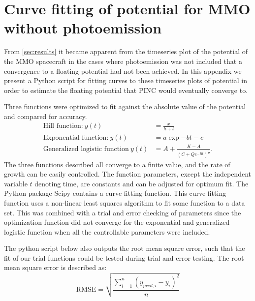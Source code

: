 \chapter{Curve fitting of potential for MMO without photoemission}
\label{sec:appendixC}
\newenvironment{longlisting}{\captionsetup{type=listing}}{}

From \cref{sec:results} it became apparent from the timeseries plot of the potential of the MMO spacecraft in the cases where photoemission was not included that a convergence to a floating potential had not been achieved. In this appendix we present a Python script for fitting curves to these timeseries plots of potential in order to estimate the floating potential that PINC would eventually converge to.

Three functions were optimized to fit against the absolute value of the potential and compared for accuracy.
\begin{subequations}
    \begin{align}
        \text{Hill function:} \: y(t) &= \frac{x}{h + t}\label{eq:Hill} \\
        \text{Exponential function:} \: y(t) &= a \exp{-b t} - c \label{eq:expFit} \\
        \text{Generalized logistic function} \: y(t) &=  A + \frac{K - A}{\left(C + Q e^{-B t}\right)^{\frac{1}{\nu}}}.\label{eq:genLog}
    \end{align}
\end{subequations}
The three functions described all converge to a finite value, and the rate of growth can be easily controlled. The function parameters, except the independent variable $t$ denoting time, are constants and can be adjusted for optimum fit. The Python package Scipy contains a curve fitting function. This curve fitting function uses a non-linear least squares algorithm to fit some function to a data set. This was combined with a trial and error checking of parameters since the optimization function did not converge for the exponential and generalized logistic function when all the controllable parameters were included. 

The python script below also outputs the root mean square error, such that the fit of our trial functions could be tested during trial and error testing. The root mean square error is described as:
\begin{equation}\label{eq:RMSE}
    \text{RMSE} = \sqrt{\frac{\sum^n_{i=1} \left(y_{pred,i} - y_i \right)^2}{n}}
\end{equation}

